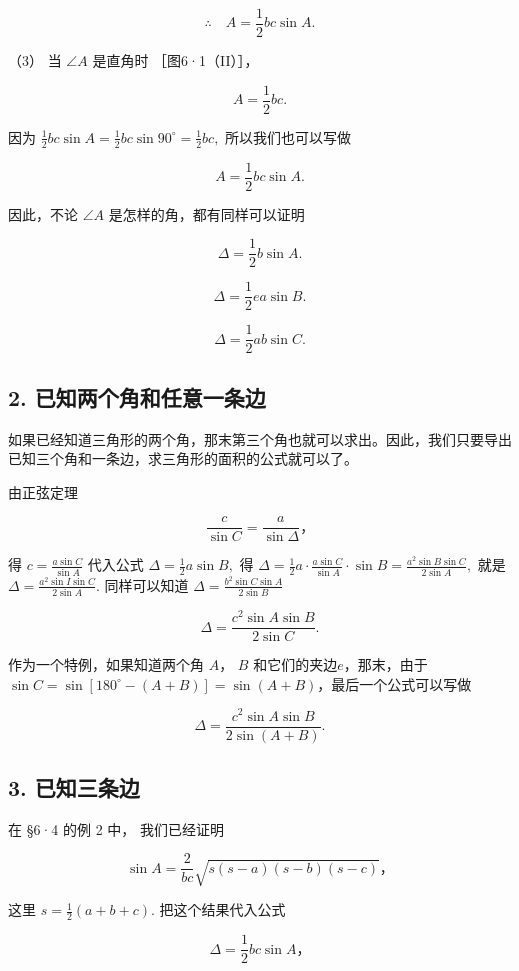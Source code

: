 \[
\therefore \quad A = \frac {1}{2} b c \sin A.
\]

（3） 当 \(\angle A\) 是直角时 ［图6·1（II）］，

\[
A = \frac {1}{2} b c.
\]

因为
\(\frac{1}{2} bc\sin A = \frac{1}{2} bc\sin 90^{\circ} = \frac{1}{2} bc,\)
所以我们也可以写做

\[
A = \frac {1}{2} b c \sin A.
\]

因此，不论 \(\angle A\) 是怎样的角，都有同样可以证明

\[
\Delta = \frac {1}{2} b \sin A.
\]

\[
\Delta = \frac {1}{2} e a \sin B.
\]

\[
\Delta = \frac {1}{2} a b \sin C.
\]

\subsection{2. 已知两个角和任意一条边}

如果已经知道三角形的两个角，那末第三个角也就可以求出。因此，我们只要导出已知三个角和一条边，求三角形的面积的公式就可以了。

由正弦定理

\[
\frac {c}{\sin C} = \frac {a}{\sin \Delta}\text{，}
\]

得 \(c = \frac{a\sin C}{\sin A}\) 代入公式
\(\Delta = \frac{1}{2} a\sin B,\) 得
\(\Delta = \frac{1}{2} a\cdot \frac{a\sin C}{\sin A}\cdot \sin B = \frac{a^2\sin B\sin C}{2\sin A},\)
就是 \(\Delta = \frac{a^2\sin I\sin C}{2\sin A}.\) 同样可以知道
\(\Delta = \frac{b^2\sin C\sin A}{2\sin B}\)

\[
\Delta = \frac {c ^ {2} \sin A \sin B}{2 \sin C}.
\]

作为一个特例，如果知道两个角 \(A\)， \(B\) 和它们的夹边\(e\)，那末，由于
\(\sin C = \sin [180^{\circ} - (A + B)] = \sin (A + B)\)，最后一个公式可以写做

\[
\Delta = \frac {c ^ {2} \sin A \sin B}{2 \sin (A + B)}.
\]

\subsection{3. 已知三条边}

在 §6·4 的例 2 中， 我们已经证明

\[
\sin A = \frac {2}{b c} \sqrt {s (s - a) (s - b) (s - c)}\text{，}
\]

这里 \(s = \frac{1}{2} (a + b + c).\) 把这个结果代入公式

\[
\Delta = \frac {1}{2} b c \sin A\text{，}
\]

